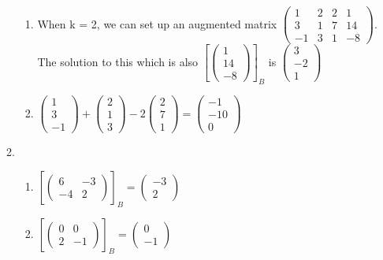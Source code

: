 \documentclass{article}
\begin{document}
\begin{enumerate}
\begin{enumerate}
\begin{enumerate}
\item When k = 2, we can set up an augmented matrix $\left(\begin{array}{ccc|c} 1 & 2 & 2 & 1 \\ 3 & 1 & 7 & 14 \\ -1 & 3 & 1 & -8 \end{array}\right)$. The solution to this which is also $[\left(\begin{array}{c} 1 \\ 14 \\ -8 \end{array}\right)]_B$ is $\left(\begin{array}{c} 3 \\ -2 \\ 1 \end{array}\right)$

\item $ \left(\begin{array}{c} 1 \\ 3 \\ -1 \end{array}\right) + \left(\begin{array}{c} 2 \\ 1 \\ 3 \end{array}\right) - 2 \left(\begin{array}{c} 2 \\ 7 \\ 1 \end{array}\right) = \left(\begin{array}{c} -1 \\ -10 \\ 0 \end{array}\right)$

\end{enumerate}

\item

\begin{enumerate}

\item $\left[ \left(\begin{array}{cc} 6 & -3 \\ -4 & 2 \end{array}\right) \right]_B = \left(\begin{array}{c} -3 \\ 2 \end{array}\right)$

\item $\left[ \left(\begin{array}{cc} 0 & 0 \\ 2 & -1 \end{array}\right) \right]_B = \left(\begin{array}{c} 0 \\ -1 \end{array}\right)$


\end{enumerate}
\end{enumerate}
\end{enumerate}
\end{document}
